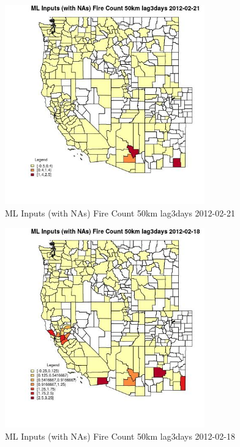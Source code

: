 \begin{figure} 
\centering  
\includegraphics[width=0.77\textwidth]{Code_Outputs/Report_ML_input_PM25_Step4_part_f_de_duplicated_aveswNAs_CountyFire_Count_50km_lag3daysMean2012-02-21.jpg} 
\caption{\label{fig:Report_ML_input_PM25_Step4_part_f_de_duplicated_aveswNAsCountyFire_Count_50km_lag3daysMean2012-02-21}ML Inputs (with NAs) Fire Count 50km lag3days 2012-02-21} 
\end{figure} 
 

\clearpage 

\begin{figure} 
\centering  
\includegraphics[width=0.77\textwidth]{Code_Outputs/Report_ML_input_PM25_Step4_part_f_de_duplicated_aveswNAs_CountyFire_Count_50km_lag3daysMean2012-02-18.jpg} 
\caption{\label{fig:Report_ML_input_PM25_Step4_part_f_de_duplicated_aveswNAsCountyFire_Count_50km_lag3daysMean2012-02-18}ML Inputs (with NAs) Fire Count 50km lag3days 2012-02-18} 
\end{figure} 
 

